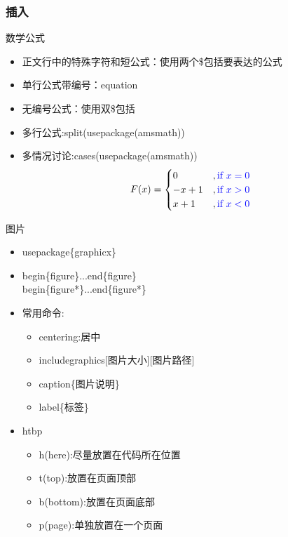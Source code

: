 \documentclass[a4paper,12pt]{article}
\begin{document}
\subsubsection{插入}
\item 数学公式
          \begin{itemize}
              \item 正文行中的特殊字符和短公式：使用两个\$包括要表达的公式
              \item 单行公式带编号：equation
              \item 无编号公式：使用双\$包括
              \item 多行公式:split(usepackage(amsmath))
              \item 多情况讨论:cases(usepackage(amsmath))
              \begin{equation}
                F(x)=
                \begin{cases}
                    0&,\color{blue}\text{if $x=0$}\\
                    -x+1&, \color{blue}\text{if $x>0$}\\
                    x+1&, \color{blue}\text{if $x<0$}
                \end{cases}
              \end{equation}
          \end{itemize}
\item 图片
          \begin{itemize}
              \item usepackage\{graphicx\}
              \item begin\{figure\}...end\{figure\}\\begin\{figure*\}...end\{figure*\}
              \item 常用命令:
                    \begin{itemize}
                        \item centering:居中
                        \item includegraphics[图片大小][图片路径]
                        \item caption\{图片说明\}
                        \item label\{标签\}
                    \end{itemize}
              \item htbp
                    \begin{itemize}
                        \item h(here):尽量放置在代码所在位置
                        \item t(top):放置在页面顶部
                        \item b(bottom):放置在页面底部
                        \item p(page):单独放置在一个页面
                    \end{itemize}
          \end{itemize}
\end{document}
